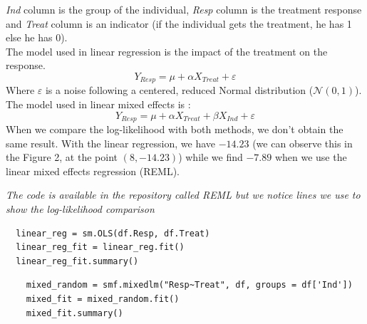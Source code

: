 \documentclass{article}
\begin{document}
\textit{Ind} column is the group of the individual, \textit{Resp} column is the treatment response and \textit{Treat} column is an indicator (if the individual gets the treatment, he has 1 else he has 0).\\
The model used in linear regression is the impact of the treatment on the response.
\begin{equation*}
    Y_{Resp} = \mu +  \alpha X_{Treat} + \varepsilon
\end{equation*}
Where $\varepsilon$ is a noise following a centered, reduced Normal distribution ($\mathcal{N}(0, 1)$).\\
The model used in linear mixed effects is :
\begin{equation*}
    Y_{Resp} = \mu + \alpha X_{Treat}  + \beta X_{Ind} +\varepsilon
\end{equation*}
When we compare the log-likelihood with both methods, we don't obtain the same result.
With the linear regression, we have $-14.23$ (we can observe this in the Figure 2, at the point $(8, -14.23)$) while we find $-7.89$ when we use the linear mixed effects regression (REML).\\
\begin{remark}
\textit{The code is available in the repository called REML but we notice lines we use to show the log-likelihood comparison}
\end{remark}
\begin{lstlisting}
  linear_reg = sm.OLS(df.Resp, df.Treat)
  linear_reg_fit = linear_reg.fit()
  linear_reg_fit.summary()
\end{lstlisting}
\begin{lstlisting}
    mixed_random = smf.mixedlm("Resp~Treat", df, groups = df['Ind'])
    mixed_fit = mixed_random.fit()
    mixed_fit.summary() 
\end{lstlisting}
\end{document}

